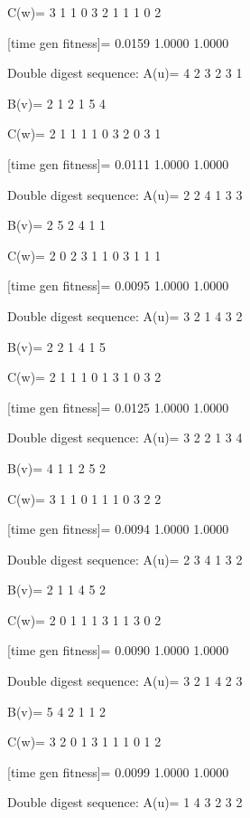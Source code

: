 C(w)=
     3     1     1     0     3     2     1     1     1     0     2

[time gen fitness]=
    0.0159    1.0000    1.0000

Double digest sequence:
A(u)=
     4     2     3     2     3     1

B(v)=
     2     1     2     1     5     4

C(w)=
     2     1     1     1     1     0     3     2     0     3     1

[time gen fitness]=
    0.0111    1.0000    1.0000

Double digest sequence:
A(u)=
     2     2     4     1     3     3

B(v)=
     2     5     2     4     1     1

C(w)=
     2     0     2     3     1     1     0     3     1     1     1

[time gen fitness]=
    0.0095    1.0000    1.0000

Double digest sequence:
A(u)=
     3     2     1     4     3     2

B(v)=
     2     2     1     4     1     5

C(w)=
     2     1     1     1     0     1     3     1     0     3     2

[time gen fitness]=
    0.0125    1.0000    1.0000

Double digest sequence:
A(u)=
     3     2     2     1     3     4

B(v)=
     4     1     1     2     5     2

C(w)=
     3     1     1     0     1     1     1     0     3     2     2

[time gen fitness]=
    0.0094    1.0000    1.0000

Double digest sequence:
A(u)=
     2     3     4     1     3     2

B(v)=
     2     1     1     4     5     2

C(w)=
     2     0     1     1     1     3     1     1     3     0     2

[time gen fitness]=
    0.0090    1.0000    1.0000

Double digest sequence:
A(u)=
     3     2     1     4     2     3

B(v)=
     5     4     2     1     1     2

C(w)=
     3     2     0     1     3     1     1     1     0     1     2

[time gen fitness]=
    0.0099    1.0000    1.0000

Double digest sequence:
A(u)=
     1     4     3     2     3     2

